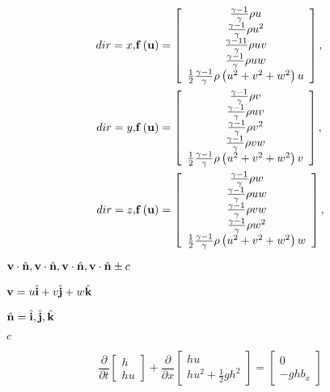 \documentclass{article}
\begin{document}
\begin{eqnarray} dir = x, & {\bf f}\left({\bf u}\right) = \left[\begin{array}{c} \frac{\gamma-1}{\gamma}\rho u \\ \frac{\gamma-1}{\gamma}\rho u^2 \\ \frac{\gamma-11}{\gamma}\rho u v \\ \frac{\gamma-1}{\gamma}\rho u w \\ \frac{1}{2} \frac{\gamma-1}{\gamma}\rho\left(u^2+v^2+w^2\right)u \end{array}\right], \\ dir = y, & {\bf f}\left({\bf u}\right) = \left[\begin{array}{c} \frac{\gamma-1}{\gamma}\rho v \\ \frac{\gamma-1}{\gamma}\rho u v \\ \frac{\gamma-1}{\gamma}\rho v^2 \\ \frac{\gamma-1}{\gamma}\rho v w \\ \frac{1}{2} \frac{\gamma-1}{\gamma}\rho\left(u^2+v^2+w^2\right)v \end{array}\right], \\ dir = z, & {\bf f}\left({\bf u}\right) = \left[\begin{array}{c} \frac{\gamma-1}{\gamma}\rho w \\ \frac{\gamma-1}{\gamma}\rho u w \\ \frac{\gamma-1}{\gamma}\rho v w \\ \frac{\gamma-1}{\gamma}\rho w^2 \\ \frac{1}{2} \frac{\gamma-1}{\gamma}\rho\left(u^2+v^2+w^2\right)w \end{array}\right], \\ \end{eqnarray}
\pagebreak

$ {\bf v}\cdot\hat{\bf n}, {\bf v}\cdot\hat{\bf n}, {\bf v}\cdot\hat{\bf n}, {\bf v}\cdot\hat{\bf n} \pm c$
\pagebreak

${\bf v} = u\hat{\bf i} + v\hat{\bf j} + w\hat{\bf k}$
\pagebreak

$\hat{\bf n} = \hat{\bf i}, \hat{\bf j}, \hat{\bf k}$
\pagebreak

$c$
\pagebreak

\begin{equation} \frac {\partial} {\partial t} \left[\begin{array}{c} h \\ hu \end{array} \right] + \frac {\partial} {\partial x} \left[\begin{array}{c} hu \\ hu^2 + \frac{1}{2}gh^2 \end{array} \right] = \left[\begin{array}{c} 0 \\ -ghb_x \end{array}\right] \end{equation}
\pagebreak
\end{document}
